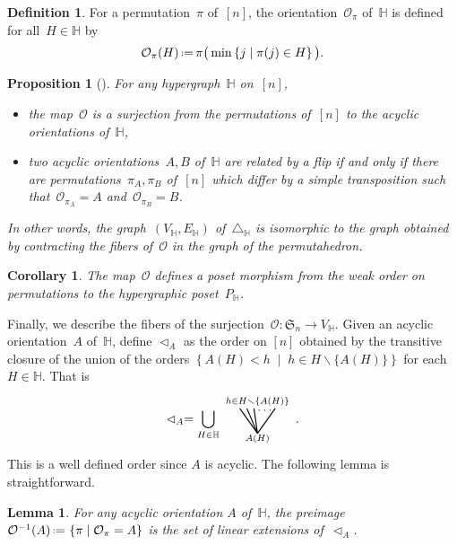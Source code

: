 \documentclass[reqno]{amsart}
\newtheorem{corollary}[theorem]{Corollary}
\newtheorem{proposition}[theorem]{Proposition}
\newtheorem{lemma}[theorem]{Lemma}
\theoremstyle{definition}
\newtheorem{definition}[theorem]{Definition}
\newcommand{\set}[2]{\left\{ #1 \;\middle|\; #2 \right\}} %
\newcommand{\ssm}{\smallsetminus} %
\newcommand{\eqdef}{\mbox{\,\raisebox{0.2ex}{\scriptsize\ensuremath{\mathrm:}}\ensuremath{=}\,}} %
\newcommand{\simplex}{\triangle} %
\newcommand{\fS}{\mathfrak{S}} %
\newcommand{\less}{\vartriangleleft} %
\newcommand{\Or}{\mathcal O}  %
\newcommand{\HH}{\mathbb H}  %
\begin{document}
\begin{definition}
\label{def:surjection}
For a permutation~$\pi$ of~$[n]$, the orientation~$\Or_\pi$ of~$\HH$ is defined for all~$H \in \HH$ by
\[
\Or_\pi(H) \eqdef  \pi\big(\min\set{j}{\pi(j)\in H}\big).
\]
\end{definition}

\begin{proposition}[{\cite[Lem.~2.9]{BenedettiBergeronMachacek}}]
For any hypergraph~$\HH$ on~$[n]$,
\begin{itemize}
\item the map~$\Or$ is a surjection from the permutations of~$[n]$ to the acyclic orientations of~$\HH$,
\item two acyclic orientations~$A,B$ of~$\HH$ are related by a flip if and only if there are permutations~$\pi_A, \pi_B$ of~$[n]$ which differ by a simple transposition such that~$\Or_{\pi_A} = A$ and~$\Or_{\pi_B} = B$.
\end{itemize}
In other words, the graph~$(V_\HH, E_\HH)$ of~$\simplex_\HH$ is isomorphic to the graph obtained by contracting the fibers of~$\Or$ in the graph of the permutahedron.
\end{proposition}

\begin{corollary}
\label{coro:weakToP}
The map~$\Or$ defines a poset morphism from the weak order on permutations to the hypergraphic poset~$P_\HH$.
\end{corollary}

Finally, we describe the fibers of the surjection~$\Or : \fS_n \to V_\HH$.
Given an acyclic orientation~$A$ of~$\HH$, define $\less_A$ as the order on $[n]$ obtained by the transitive closure of the union of the \linebreak orders $\set{A(H) < h}{h \in H \ssm \{A(H)\}}$ for each $H \in \HH$.
That is
\[
	\less_A =  \bigcup_{H \in \HH} 
	\begin{tikzpicture}[scale=1,baseline=.0cm]
		\node at (0,-.45) {$\scriptstyle A(H)$};
		\node at (0,.6) {$\scriptstyle h \in H \ssm \{A(H)\}$};
		\node at (.2,.35) {$\ldots$};
		\draw [thick] (0,-.3)--(-.5,.4); 
		\draw [thick] (0,-.3)--(-.3,.4); 
		\draw [thick] (0,-.3)--(-.1,.4); 
		\draw [thick] (0,-.3)--(.5,.4); 
	\end{tikzpicture} \,.
\]
This is a well defined order since $A$ is acyclic.
The following lemma is straightforward.

\begin{lemma}
\label{lem:prepi}
For any acyclic orientation $A$ of~$\HH$, the preimage $\Or^{-1}(A) \eqdef \set{\pi}{\Or_\pi=A}$ is the set of linear extensions of~$\less_A$.
\end{lemma}
\end{document}
